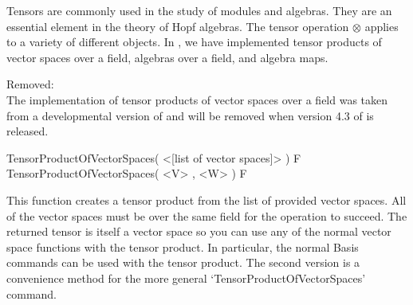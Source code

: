 %
%
%



Tensors are commonly used in the study of modules and algebras.
They are an essential element in the theory of Hopf algebras.
The tensor operation $\otimes$ applies to a variety of different objects.
In {\QPA}, we have implemented tensor products of vector spaces over a field, algebras over a field, and algebra maps.

Removed:\\
The implementation of tensor products of vector spaces over a field was taken from a developmental version of {\GAP} and will be removed when version 4.3 of {\GAP} is released.


\>TensorProductOfVectorSpaces( <[list of vector spaces]> ) F
\>TensorProductOfVectorSpaces( <V> , <W> ) F

This function creates a tensor product from the list of provided vector spaces.
All of the vector spaces must be over the same field for the operation to succeed.
The returned tensor is itself a vector space so you can use any of the normal vector space functions with the tensor product.
In particular, the normal Basis commands can be used with the tensor product.
The second version is a convenience method for the more general `TensorProductOfVectorSpaces' command.

